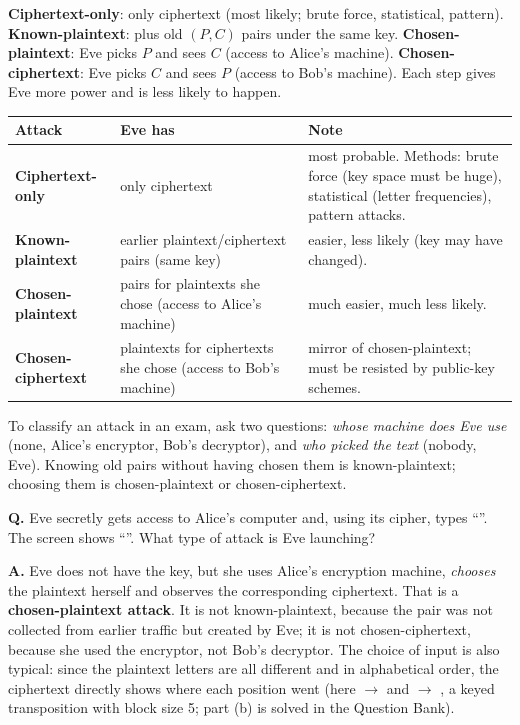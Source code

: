 \begin{mustknow}
\textbf{Ciphertext-only}: only ciphertext (most likely; brute force, statistical, pattern). \textbf{Known-plaintext}: plus old $(P, C)$ pairs under the same key. \textbf{Chosen-plaintext}: Eve picks $P$ and sees $C$ (access to Alice's machine). \textbf{Chosen-ciphertext}: Eve picks $C$ and sees $P$ (access to Bob's machine). Each step gives Eve more power and is less likely to happen.
\end{mustknow}
\begin{center}\small
\begin{tabularx}{\textwidth}{@{}l X X@{}}
\toprule
Attack & Eve has & Note\\
\midrule
\textbf{Ciphertext-only} & only ciphertext & most probable. Methods: brute force (key space must be huge), statistical (letter frequencies), pattern attacks.\\
\textbf{Known-plaintext} & earlier plaintext/ciphertext pairs (same key) & easier, less likely (key may have changed).\\
\textbf{Chosen-plaintext} & pairs for plaintexts she chose (access to Alice's machine) & much easier, much less likely.\\
\textbf{Chosen-ciphertext} & plaintexts for ciphertexts she chose (access to Bob's machine) & mirror of chosen-plaintext; must be resisted by public-key schemes.\\
\bottomrule
\end{tabularx}
\end{center}
To classify an attack in an exam, ask two questions: \emph{whose machine does Eve use} (none, Alice's encryptor, Bob's decryptor), and \emph{who picked the text} (nobody, Eve). Knowing old pairs without having chosen them is known-plaintext; choosing them is chosen-plaintext or chosen-ciphertext.

\begin{worked}
\textbf{Q.} Eve secretly gets access to Alice's computer and, using its cipher, types ``''. The screen shows ``''. What type of attack is Eve launching?

\textbf{A.} Eve does not have the key, but she uses Alice's encryption machine, \emph{chooses} the plaintext herself and observes the corresponding ciphertext. That is a \textbf{chosen-plaintext attack}. It is not known-plaintext, because the pair was not collected from earlier traffic but created by Eve; it is not chosen-ciphertext, because she used the encryptor, not Bob's decryptor. The choice of input is also typical: since the plaintext letters are all different and in alphabetical order, the ciphertext directly shows where each position went (here  $\to$  and  $\to$ , a keyed transposition with block size 5; part (b) is solved in the Question Bank).
\end{worked}

